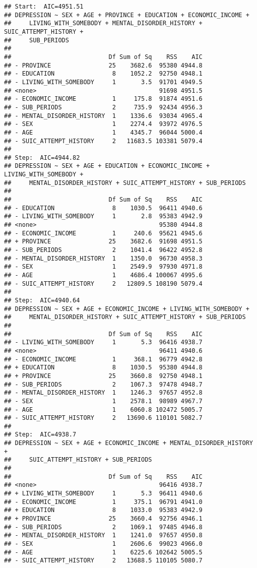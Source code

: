 \documentclass[
]{book}
\begin{document}
\begin{verbatim}
## Start:  AIC=4951.51
## DEPRESSION ~ SEX + AGE + PROVINCE + EDUCATION + ECONOMIC_INCOME + 
##     LIVING_WITH_SOMEBODY + MENTAL_DISORDER_HISTORY + SUIC_ATTEMPT_HISTORY + 
##     SUB_PERIODS
## 
##                           Df Sum of Sq    RSS    AIC
## - PROVINCE                25    3682.6  95380 4944.8
## - EDUCATION                8    1052.2  92750 4948.1
## - LIVING_WITH_SOMEBODY     1       3.5  91701 4949.5
## <none>                                  91698 4951.5
## - ECONOMIC_INCOME          1     175.8  91874 4951.6
## - SUB_PERIODS              2     735.9  92434 4956.3
## - MENTAL_DISORDER_HISTORY  1    1336.6  93034 4965.4
## - SEX                      1    2274.4  93972 4976.5
## - AGE                      1    4345.7  96044 5000.4
## - SUIC_ATTEMPT_HISTORY     2   11683.5 103381 5079.4
## 
## Step:  AIC=4944.82
## DEPRESSION ~ SEX + AGE + EDUCATION + ECONOMIC_INCOME + LIVING_WITH_SOMEBODY + 
##     MENTAL_DISORDER_HISTORY + SUIC_ATTEMPT_HISTORY + SUB_PERIODS
## 
##                           Df Sum of Sq    RSS    AIC
## - EDUCATION                8    1030.5  96411 4940.6
## - LIVING_WITH_SOMEBODY     1       2.8  95383 4942.9
## <none>                                  95380 4944.8
## - ECONOMIC_INCOME          1     240.6  95621 4945.6
## + PROVINCE                25    3682.6  91698 4951.5
## - SUB_PERIODS              2    1041.4  96422 4952.8
## - MENTAL_DISORDER_HISTORY  1    1350.0  96730 4958.3
## - SEX                      1    2549.9  97930 4971.8
## - AGE                      1    4686.4 100067 4995.6
## - SUIC_ATTEMPT_HISTORY     2   12809.5 108190 5079.4
## 
## Step:  AIC=4940.64
## DEPRESSION ~ SEX + AGE + ECONOMIC_INCOME + LIVING_WITH_SOMEBODY + 
##     MENTAL_DISORDER_HISTORY + SUIC_ATTEMPT_HISTORY + SUB_PERIODS
## 
##                           Df Sum of Sq    RSS    AIC
## - LIVING_WITH_SOMEBODY     1       5.3  96416 4938.7
## <none>                                  96411 4940.6
## - ECONOMIC_INCOME          1     368.1  96779 4942.8
## + EDUCATION                8    1030.5  95380 4944.8
## + PROVINCE                25    3660.8  92750 4948.1
## - SUB_PERIODS              2    1067.3  97478 4948.7
## - MENTAL_DISORDER_HISTORY  1    1246.3  97657 4952.8
## - SEX                      1    2578.1  98989 4967.7
## - AGE                      1    6060.8 102472 5005.7
## - SUIC_ATTEMPT_HISTORY     2   13690.6 110101 5082.7
## 
## Step:  AIC=4938.7
## DEPRESSION ~ SEX + AGE + ECONOMIC_INCOME + MENTAL_DISORDER_HISTORY + 
##     SUIC_ATTEMPT_HISTORY + SUB_PERIODS
## 
##                           Df Sum of Sq    RSS    AIC
## <none>                                  96416 4938.7
## + LIVING_WITH_SOMEBODY     1       5.3  96411 4940.6
## - ECONOMIC_INCOME          1     375.1  96791 4941.0
## + EDUCATION                8    1033.0  95383 4942.9
## + PROVINCE                25    3660.4  92756 4946.1
## - SUB_PERIODS              2    1069.1  97485 4946.8
## - MENTAL_DISORDER_HISTORY  1    1241.0  97657 4950.8
## - SEX                      1    2606.6  99023 4966.0
## - AGE                      1    6225.6 102642 5005.5
## - SUIC_ATTEMPT_HISTORY     2   13688.5 110105 5080.7
\end{verbatim}
\end{document}
